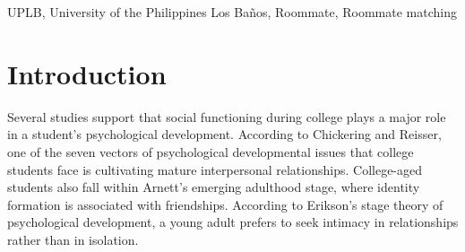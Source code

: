 \documentclass[journal]{./IEEE/IEEEtran}
\title{\SPTITLE}
\author{\ADVISEE~and~\ADVISER
\REMARK
}
\newcommand{\UPLB}{University of the Philippines Los Ba\~{n}os }
\begin{document}
\maketitle

\begin{abstract}
    This article explores the role and significance of roommates in a college student's development - from the initial
    adaptation with the roommate setting, to their academic performance and life after college. The importance of
    finding the proper roommates so that a student can maximize their psychological development, get higher grades, and
    develop open-mindedness is highlighted. A solution is proposed in the form of a web application that can help \UPLB
    students find mutually beneficial roommates for their college life. This solution also extends itself to solve the
    dorm-finding problem students experience at the start of every semester.

\end{abstract}

\begin{keywords}
UPLB, University of the Philippines Los Ba\~{n}os, Roommate, Roommate matching
\end{keywords}

\section{Introduction}

    Several studies support that social functioning during college plays a major role in a student's psychological
    development. According to Chickering and Reisser, one of the seven vectors of psychological developmental issues
    that college students face is cultivating mature interpersonal relationships\cite{chickering}. College-aged students
    also fall within Arnett's emerging adulthood stage, where identity formation is associated with
    friendships\cite{erb}. According to Erikson's stage theory of psychological development, a young adult prefers to
    seek intimacy in relationships rather than in isolation\cite{erikson}. 
\end{document}
